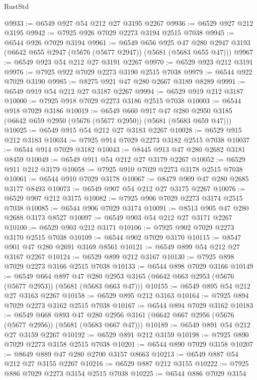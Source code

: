 \begin{lexlean}{RustStd}
\begin{coremodule}
@9933 := @6549 @927 @54 @212 @27 @3195 @2267
@9936 := @6529 @927 @212 @3195
@9942 := @7925 @926 @7029 @2273 @3194 @2515 @7038
@9945 := @6544 @926 @7029 @3194
@9961 := @6549
    @656
    @925
    @47
    @280
    @2947
    @3193
    (@6642 @655 @2947 (@5676 (@5677 @2947)) (@5681 (@5683 @655 @47)))
@9967 := @6549 @923 @54 @212 @27 @3191 @2267
@9970 := @6529 @923 @212 @3191
@9976 := @7925 @922 @7029 @2273 @3190 @2515 @7038
@9979 := @6544 @922 @7029 @3190
@9985 := @8275 @921 @47 @280 @2667 @3189 @8289
@9991 := @6549 @919 @54 @212 @27 @3187 @2267
@9994 := @6529 @919 @212 @3187
@10000 := @7925 @918 @7029 @2273 @3186 @2515 @7038
@10003 := @6544 @918 @7029 @3186
@10019 := @6549
    @660
    @917
    @47
    @280
    @2950
    @3185
    (@6642 @659 @2950 (@5676 (@5677 @2950)) (@5681 (@5683 @659 @47)))
@10025 := @6549 @915 @54 @212 @27 @3183 @2267
@10028 := @6529 @915 @212 @3183
@10034 := @7925 @914 @7029 @2273 @3182 @2515 @7038
@10037 := @6544 @914 @7029 @3182
@10043 := @8445 @913 @47 @280 @2682 @3181 @8459
@10049 := @6549 @911 @54 @212 @27 @3179 @2267
@10052 := @6529 @911 @212 @3179
@10058 := @7925 @910 @7029 @2273 @3178 @2515 @7038
@10061 := @6544 @910 @7029 @3178
@10067 := @8479 @909 @47 @280 @2685 @3177 @8493
@10073 := @6549 @907 @54 @212 @27 @3175 @2267
@10076 := @6529 @907 @212 @3175
@10082 := @7925 @906 @7029 @2273 @3174 @2515 @7038
@10085 := @6544 @906 @7029 @3174
@10091 := @8513 @905 @47 @280 @2688 @3173 @8527
@10097 := @6549 @903 @54 @212 @27 @3171 @2267
@10100 := @6529 @903 @212 @3171
@10106 := @7925 @902 @7029 @2273 @3170 @2515 @7038
@10109 := @6544 @902 @7029 @3170
@10115 := @8547 @901 @47 @280 @2691 @3169 @8561
@10121 := @6549 @899 @54 @212 @27 @3167 @2267
@10124 := @6529 @899 @212 @3167
@10130 := @7925 @898 @7029 @2273 @3166 @2515 @7038
@10133 := @6544 @898 @7029 @3166
@10149 := @6549
    @664
    @897
    @47
    @280
    @2953
    @3165
    (@6642 @663 @2953 (@5676 (@5677 @2953)) (@5681 (@5683 @663 @47)))
@10155 := @6549 @895 @54 @212 @27 @3163 @2267
@10158 := @6529 @895 @212 @3163
@10164 := @7925 @894 @7029 @2273 @3162 @2515 @7038
@10167 := @6544 @894 @7029 @3162
@10183 := @6549
    @668
    @893
    @47
    @280
    @2956
    @3161
    (@6642 @667 @2956 (@5676 (@5677 @2956)) (@5681 (@5683 @667 @47)))
@10189 := @6549 @891 @54 @212 @27 @3159 @2267
@10192 := @6529 @891 @212 @3159
@10198 := @7925 @890 @7029 @2273 @3158 @2515 @7038
@10201 := @6544 @890 @7029 @3158
@10207 := @8649 @889 @47 @280 @2700 @3157 @8663
@10213 := @6549 @887 @54 @212 @27 @3155 @2267
@10216 := @6529 @887 @212 @3155
@10222 := @7925 @886 @7029 @2273 @3154 @2515 @7038
@10225 := @6544 @886 @7029 @3154

\end{coremodule}
\end{lexlean}
